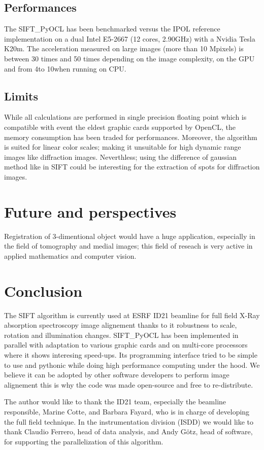 \documentclass[preprint]{iucr}
\begin{document}
\subsection{Performances}

The SIFT\_PyOCL has been benchmarked versus the IPOL reference implementation on
a dual Intel E5-2667 (12 cores, 2.90GHz) with a Nvidia Tesla K20m. The
acceleration measured on large images (more than 10 Mpixels) is between 30 times
and 50 times depending on the image complexity, on the GPU and from 4\times to
10\times when running on CPU.

\subsection{Limits}
While all calculations are performed in single precision floating point which is
compatible with event the eldest graphic cards supported by OpenCL, the memory
consumption has been traded for performances. Moreover, the algorithm is suited
for linear color scales; making it unsuitable for high dynamic range
images like diffraction images.
Neverthless; using the difference of gaussian method like in
SIFT could be interesting for the extraction of spots for diffraction
images.


\section{Future and perspectives}

Registration of 3-dimentional object would have a huge application, especially
in the field of tomography and medial images; this field of reseach is very
active in applied mathematics and computer vision.


\section{Conclusion}

The SIFT algorithm is currently used at ESRF ID21 beamline for full field X-Ray
absorption spectroscopy image alignement thanks to it robustness to scale,
rotation and illumination changes. 
SIFT\_PyOCL has been implemented in parallel with adaptation to various
graphic cards and on multi-core processors where it shows interesing speed-ups.
Its programming interface tried to be simple to use and pythonic while doing
high performance computing under the hood. We believe it can be adopted by other
software developers to perform image alignement this is why the code was made
open-source and free to re-distribute.



The author would like to thank the ID21 team, especially the beamline
responsible, Marine Cotte, and Barbara Fayard, who is in charge of developing
the full field technique.
In the instrumentation division (ISDD) we would like to thank Claudio Ferrero,
head of data analysis, and Andy G\"otz, head of software, for supporting the
parallelization of this algorithm.



\end{document}
